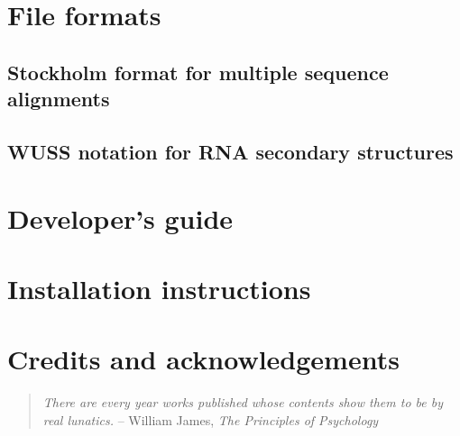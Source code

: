 \documentclass[10pt]{book}
\begin{document}
\chapter{File formats}

\section{Stockholm format for multiple sequence alignments}




\newpage
\section{WUSS notation for RNA secondary structures}



\newpage
\chapter{Developer's guide}


\newpage
\chapter{Installation instructions}


\newpage
\chapter{Credits and acknowledgements}
\begin{quote}
\emph{There are every year works published whose contents show them to
  be by real lunatics.}
\hspace*{1em}\hfill -- William James, \emph{The Principles of Psychology}
\end{quote}

\newpage
\newcommand{\bibfont}{\footnotesize}


\end{document}
